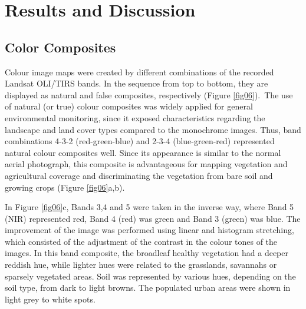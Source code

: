 \documentclass[jimaging,article,accept,pdftex,moreauthors]{Definitions/mdpi}
\begin{document}
\section{Results and Discussion}
\subsection{Color Composites}
Colour image maps were created by different combinations of the recorded Landsat OLI/TIRS bands. In the sequence from top to bottom, they are displayed as natural and false composites,  respectively{ }(Figure \ref{fig06}).~The use of natural (or true) colour composites was widely applied for general environmental monitoring, since it exposed{ }characteristics regarding the landscape and land cover types compared to the monochrome images.{ }Thus, band combinations 4-3-2 (red-green-blue) and 2-3-4 (blue-green-red) represented natural colour composites well. Since its appearance is similar to the normal aerial photograph, this composite is advantageous for mapping vegetation and agricultural coverage and discriminating the vegetation from bare soil and growing crops (Figure \ref{fig06}a,b). 

In Figure \ref{fig06}c, Bands 3,4 and 5 were taken in the inverse way, where Band 5 (NIR) represented red,  Band 4 (red) was green and  Band 3 (green) was blue. The improvement of the image was performed using linear and histogram stretching, which consisted of the adjustment of the contrast in the colour tones of the images. In this band composite, the broadleaf healthy vegetation had a deeper reddish hue, while lighter hues were related to the grasslands, savannahs{ }or sparsely vegetated areas. Soil was represented by various hues, depending on the soil type, from dark to light browns. The populated urban areas were shown in light grey to white spots. 

\end{document}
